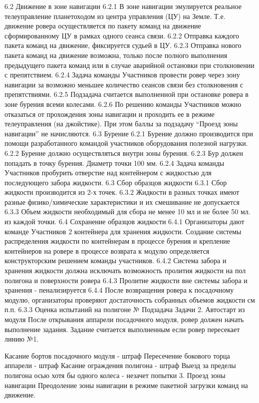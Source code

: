 \begin{table}
\begin{longtable}
6.2 Движение в зоне навигации
	6.2.1 В зоне навигации эмулируется реальное телеуправление планетоходом из центра управления (ЦУ) на Земле. Т.е. движение ровера осуществляется по пакету команд на движение сформированному ЦУ в рамках одного сеанса связи.
	6.2.2  Отправка каждого пакета команд на движение, фиксируется судьей в ЦУ.
6.2.3 Отправка нового пакета команд на движение возможна, только после полного выполнения предыдущего пакета команд или в случае аварийной остановки при столкновении с препятствием. 
6.2.4 Задача команды Участников провести ровер через зону навигации за возможно меньшее количество сеансов связи без столкновения с препятствиями.
6.2.5 Подзадача считается выполненной при остановке ровера в зоне бурения всеми колесами.
6.2.6 По решению команды Участников можно отказаться от прохождения зоны навигации и проходить ее в режиме телеуправления (на джойстике). При этом баллы за подзадачу “Проезд зоны навигации” не начисляются.
6.3 Бурение
6.2.1 Бурение должно производится при помощи разработанного командой участников оборудования полезной нагрузки.
6.2.2 Бурение должно осуществляться внутри зоны бурения.
6.2.3 Бур должен попадать в точку бурения. Диаметр точки 100 мм.
6.2.4 Задача команды Участников пробурить отверстие над контейнером с жидкостью для последующего забора жидкости.
6.3 Сбор образцов жидкости
6.3.1 Сбор жидкости производится из 2-х точек. 
6.3.2 Жидкости в разных точках имеют разные физико/химические характеристики и их смешивание не допускается
6.3.3 Объем жидкости необходимый для сбора не менее 10 мл и не более 50 мл. из каждой точки.
6.4 Сохранение образцов жидкости
6.4.1 Организаторы дают команде Участников 2 контейнера для хранения жидкости. Создание системы распределения жидкости по контейнерам в процессе бурения и крепление контейнеров на ровере в процессе возврата к модулю определяется конструкторским решением команды участников. 
6.4.2 Система забора и хранения жидкости должна исключать возможность пролития жидкости на пол полигона и поверхности ровера
6.4.3 Пролитие жидкости вне системы забора и хранения - пенализируется
6.4.4 После возвращения ровера к посадочному модулю, организаторы проверяют достаточность собранных объемов жидкости см п.п. 6.3.3
Оценка испытаний на полигоне
№	Подзадача	Задачи
2.	Автостарт из модуля	После открывания аппарели посадочного модуля, ровер должен начать выполнение задания. Задание считается выполненным если ровер пересекает линию №1.

Касание бортов посадочного модуля - штраф 
Пересечение бокового торца аппарели - штраф Касание ограждения полигона - штраф
Выезд за пределы полигона осью хотя бы одного колеса - незачет попытки
3.	Проезд зоны навигации	Преодоление зоны навигации в режиме пакетной загрузки команд на движение.


\end{longtable}
\end{table}
